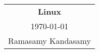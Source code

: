 



\raggedright
\footnotesize
\begin{multicols*}{3}
\setlength{\premulticols}{1pt}
\setlength{\postmulticols}{1pt}
\setlength{\multicolsep}{1pt}
\setlength{\columnsep}{2pt}


\begin{center}
\begin{tabular}{c}
\Large{\textbf{Linux}}\\
\today\\
Ramasamy Kandasamy\\
\end{tabular}
\end{center}
















\end{multicols*}




